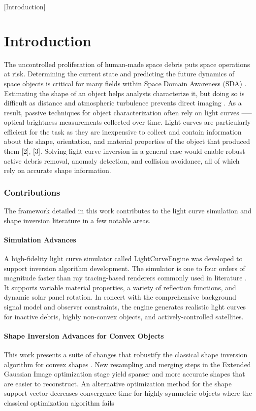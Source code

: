 [Introduction]
\chapter{Introduction}

The uncontrolled proliferation of human-made space debris puts space operations at risk. Determining the current state and predicting the future dynamics of space objects is critical for many fields within Space Domain Awareness (SDA) \cite{frueh2019notes}. Estimating the shape of an object helps analysts characterize it, but doing so is difficult as distance and atmospheric turbulence prevents direct imaging \cite{fan2020thesis}. As a result, passive techniques for object characterization often rely on light curves --— optical brightness measurements collected over time. Light curves are particularly efficient for the task as they are inexpensive to collect and contain information about the shape, orientation, and material properties of the object that produced them [2], [3]. Solving light curve inversion in a general case would enable robust active debris removal, anomaly detection, and collision avoidance, all of which rely on accurate shape information.

\subsection{Contributions}

The framework detailed in this work contributes to the light curve simulation and shape inversion literature in a few notable areas. 

\subsubsection{Simulation Advances}

A high-fidelity light curve simulator called LightCurveEngine was developed to support inversion algorithm development. The simulator is one to four orders of magnitude faster than ray tracing-based renderers commonly used in literature \cite{fan2019, allworth2020}. It supports variable material properties, a variety of reflection functions, and dynamic solar panel rotation. In concert with the comprehensive background signal model and observer constraints, the engine generates realistic light curves for inactive debris, highly non-convex objects, and actively-controlled satellites. 

\subsubsection{Shape Inversion Advances for Convex Objects}

This work presents a suite of changes that robustify the classical shape inversion algorithm for convex shapes \cite{robinson2022}. New resampling and merging steps in the Extended Gaussian Image optimization stage yield sparser and more accurate shapes that are easier to reconstruct. An alternative optimization method for the shape support vector decreases convergence time for highly symmetric objects where the classical optimization algorithm fails